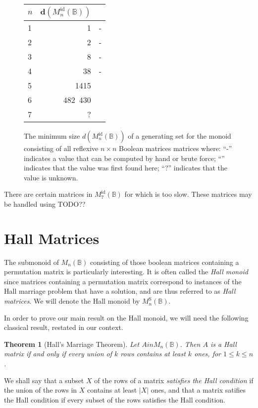 \documentclass[11pt]{article}
\newtheorem{thm}{Theorem}[section]
\numberwithin{equation}{section}
\newcommand{\B}{\mathbb{B}}
\newcommand{\Bn}{M_n(\B)}
\newcommand{\Refn}{M_n^{\text{id}}(\B)}
\newcommand{\Ref}[1]{M_{#1}^{\text{id}}(\B)}
\newcommand{\Halln}{M_n^{\text{S}}(\B)}
\newcommand{\cmark}{\ding{51}}
\begin{document}
\begin{figure}
  \centering
  \begin{tabular}{l|r|r}
    $n$ & $\mathbf{d}(\Refn)$ &   \\
    \hline
    1 & 1          & - \\ 
    2 & 2          & - \\ 
    3 & 8          & - \\ 
    4 & 38         & - \\
    5 & 1415       & \cmark \\
    6 & 482\ 430   & \cmark \\ 
    7 & ?          & \cmark \\
  \end{tabular}
  \caption{The minimum size $d(\Refn)$ of a generating set for the monoid
    consisting of all reflexive $n \times n$ Boolean matrices matrices where:
    ``-'' indicates a value that can be computed by hand or brute force;
    ``\cmark'' indicates that the value was first found here; ``?'' indicates
    that the value is unknown.}
  \label{fig:reflexiverank}
\end{figure}

There are certain matrices in $\Ref{7}$ for which
 is too slow. These matrices may be handled
using TODO??

\section{Hall Matrices}
The submonoid of $\Bn$ consisting of those boolean matrices containing a
permutation matrix is particularly interesting. It is often called the
\emph{Hall monoid} since matrices containing a permutation matrix correspond to
instances of the Hall marriage problem that have a solution, and are thus
referred to as \emph{Hall matrices}. We will denote the Hall monoid by
$\Halln$. 

In order to prove our main result on the Hall monoid, we will need the following
classical result, restated in our context.

\begin{thm}[Hall's Marriage Theorem]
  Let $A in \Bn$. Then $A$ is a Hall matrix if and only if every union of $k$
  rows contains at least $k$ ones, for $1 \leq k \leq n$.
\end{thm}
We shall say that a subset $X$ of the rows of a matrix \emph{satisfies the Hall
  condition} if the union of the rows in $X$ contains at least $|X|$ ones, and
that a matrix satifies the Hall condition if every subset of the rows satisfies
the Hall condition.
\end{document}
